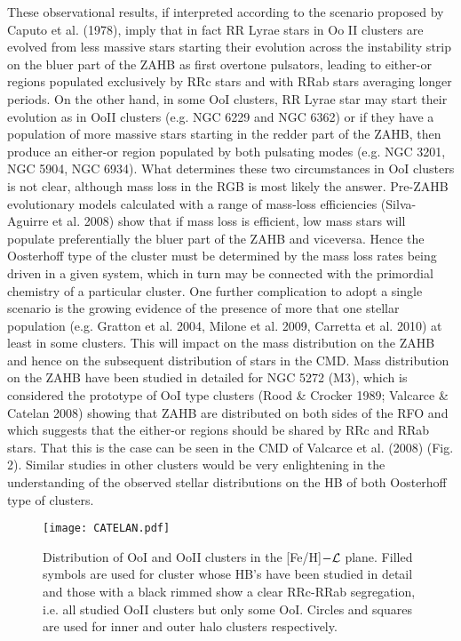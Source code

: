\documentclass[journal]{rmaa}
\newcommand{\1}{\'{\i}}
\begin{document}
These observational results, if interpreted according to the scenario proposed by
Caputo et al. (1978), imply that in fact RR Lyrae stars in Oo II clusters are
evolved from less massive stars starting their evolution across the instability strip
on the bluer part of the ZAHB as first overtone pulsators, leading to either-or
regions populated exclusively by RRc stars and with RRab stars averaging longer
periods. On the other hand, in some OoI clusters, RR Lyrae star may start their
evolution as in OoII clusters (e.g. NGC 6229 and NGC 6362) or if they have a
population of more massive stars starting in the redder part of the
ZAHB, then produce an either-or region populated by both pulsating modes (e.g. NGC
3201, NGC 5904, NGC 6934).
What determines these two circumstances in OoI clusters is not
clear, although mass loss in the RGB is most likely the answer. Pre-ZAHB evolutionary
models calculated with a range of mass-loss efficiencies (Silva-Aguirre et al. 2008)
show that if mass loss is efficient, low mass stars will populate preferentially the
bluer part of the ZAHB and viceversa. Hence the Oosterhoff type of the cluster
must be determined by the mass loss rates being driven in a given system, which in
turn may be connected with the primordial chemistry of a particular cluster. One
further complication to adopt a single scenario is the growing evidence of the
presence of more that one stellar population (e.g. Gratton et al. 2004, Milone et al.
2009, Carretta et al. 2010) at least in some clusters. This will
impact on the mass distribution on the ZAHB and hence on the subsequent distribution
of stars in the CMD. Mass distribution on the ZAHB have been studied in detailed for
NGC 5272 (M3), which is considered the prototype of OoI type clusters (Rood \&
Crocker 1989; Valcarce \& Catelan 2008) showing that ZAHB are distributed on both
sides of the RFO and which suggests that the either-or regions should be shared by
RRc and RRab stars. That this is the case can be seen in the CMD of Valcarce et al.
(2008) (Fig. 2). Similar studies in other clusters would be
very enlightening in the understanding of the observed stellar distributions on the
HB of both Oosterhoff type of clusters.


\begin{figure}
\texttt{[image: CATELAN.pdf]}
\caption{Distribution of OoI and OoII clusters in the [Fe/H]$-\cal L$ plane. Filled
symbols are used for cluster whose HB's have been studied in detail and those with a
black rimmed show a clear RRc-RRab segregation, i.e. all studied OoII clusters but
only some OoI. Circles and squares are used for inner and outer halo clusters
respectively.}
    \label{L-Fe}
\end{figure}
\end{document}

